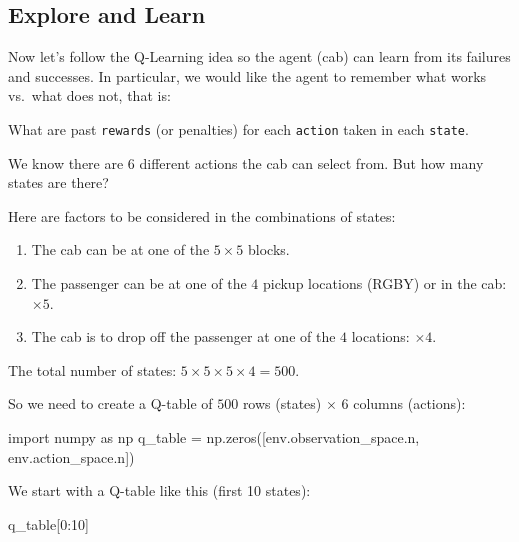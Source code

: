 \documentclass[
  letterpaper,
]{scrbook}
\newenvironment{Shaded}{\begin{snugshade}}{\end{snugshade}}
\newcommand{\DecValTok}[1]{\textcolor[rgb]{0.68,0.00,0.00}{#1}}
\newcommand{\ImportTok}[1]{\textcolor[rgb]{0.00,0.46,0.62}{#1}}
\newcommand{\NormalTok}[1]{\textcolor[rgb]{0.00,0.23,0.31}{#1}}
\newcommand{\OperatorTok}[1]{\textcolor[rgb]{0.37,0.37,0.37}{#1}}
\providecommand{\tightlist}{%
  \setlength{\itemsep}{0pt}\setlength{\parskip}{0pt}}
\begin{document}
\subsection*{Explore and Learn}\label{explore-and-learn}

Now let's follow the Q-Learning idea so the agent (cab) can learn from
its failures and successes. In particular, we would like the agent to
remember what works vs.~what does not, that is:

What are past \texttt{rewards} (or penalties) for each \texttt{action}
taken in each \texttt{state}.

We know there are \(6\) different actions the cab can select from. But
how many states are there?

Here are factors to be considered in the combinations of states:

\begin{enumerate}
\def\labelenumi{\arabic{enumi}.}
\tightlist
\item
  The cab can be at one of the \(5\times5\) blocks.
\item
  The passenger can be at one of the \(4\) pickup locations (RGBY) or in
  the cab: \(\times5\).
\item
  The cab is to drop off the passenger at one of the \(4\) locations:
  \(\times4\).
\end{enumerate}

The total number of states: \(5\times5\times5\times4=500\).

So we need to create a Q-table of \(500\) rows (states) \(\times\) \(6\)
columns (actions):

\begin{Shaded}
\begin{Highlighting}[]
\ImportTok{import}\NormalTok{ numpy }\ImportTok{as}\NormalTok{ np}
\NormalTok{q\_table }\OperatorTok{=}\NormalTok{ np.zeros([env.observation\_space.n, env.action\_space.n])}
\end{Highlighting}
\end{Shaded}

We start with a Q-table like this (first 10 states):

\begin{Shaded}
\begin{Highlighting}[]
\NormalTok{q\_table[}\DecValTok{0}\NormalTok{:}\DecValTok{10}\NormalTok{]}
\end{Highlighting}
\end{Shaded}
\end{document}
